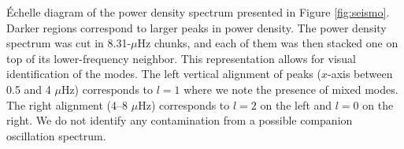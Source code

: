 \label{fig:echelle} \'Echelle diagram of the power density spectrum presented in Figure \ref{fig:seismo}. Darker regions correspond to larger peaks in power density. The power density spectrum was cut in 8.31-$\mu$Hz chunks, and each of them was then stacked one on top of its lower-frequency neighbor. This representation allows for visual identification of the modes. The left vertical alignment of peaks ($x$-axis between 0.5 and 4 $\mu$Hz) corresponds to $l=1$ where we note the presence of mixed modes. The right alignment (4--8 $\mu$Hz) corresponds to $l=2$ on the left and $l=0$ on the right. We do not identify any contamination from a possible companion oscillation spectrum.

  